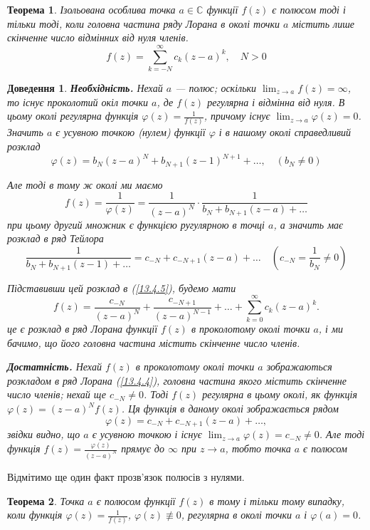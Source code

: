 \documentclass[fontsize=14pt]{scrartcl}
\theoremstyle{theorem}
\newtheorem{thm}{Теорема}[section]
\theoremstyle{proof}
\newtheorem*{dov}{Доведення}
\begin{document}
\begin{thm}\label{13.4.1}
Ізольована особлива точка $a\in\mathbb{C}$ функції $f(z)$ є полюсом тоді і тільки тоді, коли головна частина ряду Лорана в околі точки $a$ містить лише скінченне число відмінних від нуля членів.
\begin{equation}\label{13.4.4}
  f(z)=\sum_{k=-N}^{\infty}c_k(z-a)^k, \quad N>0
\end{equation}
\end{thm}
\begin{dov}
\textbf{Необхідність.} Нехай $a$ --- полюс; оскільки $\lim_{z \to a}f(z)=\infty$, то існує проколотий окіл точки $a$, де $f(z)$ регулярна і відмінна від нуля. В цьому околі регулярна функція $\varphi(z)=\frac{1}{f(z)}$, причому існує $\lim_{z \to a}\varphi(z)=0$. Значить $a$ є усувною точкою (нулем) функції $\varphi$ і в нашому околі справедливий розклад
$$\varphi(z)=b_N(z-a)^N+b_{N+1}(z-1)^{N+1}+\dots, \quad (b_N\neq 0) $$

Але тоді в тому ж околі ми маємо
\begin{equation}\label{13.4.5}
  f(z)=\frac{1}{\varphi (z)}=\frac{1}{(z-a)^N}\cdot\frac{1}{b_N+b_{N+1}(z-a)+\dots}
\end{equation}
при цьому другий множник є функцією ругулярною в точці $a$, а значить має розклад в ряд Тейлора
$$\frac{1}{b_N+b_{N+1}(z-1)+\dots}=c_{-N}+c_{-N+1}(z-a)+\dots \quad (c_{-N}=\frac{1}{b_N}\neq 0)$$

Підставивши цей розклад в (\ref{13.4.5}), будемо мати
$$f(z)=\frac{c_{-N}}{(z-a)^N}+\frac{c_{-N+1}}{(z-a)^{N-1}}+\dots +\sum_{k=0}^{\infty}c_k(z-a)^k.$$
це є розклад в ряд Лорана функції $f(z)$ в проколотому околі точки $a$, і ми бачимо, що його головна частина містить скінченне число членів.

\textbf{Достатність.} Нехай $f(z)$ в проколотому околі точки $a$ зображаються розкладом в ряд Лорана (\ref{13.4.4}), головна частина якого містить скінченне число членів; нехай ще $c_{-N}\neq 0$. Тоді $f(z)$ регулярна в цьому околі, як функція $\varphi(z)=(z-a)^Nf(z)$. Ця функція в даному околі зображається рядом
$$\varphi(z)=c_{-N}+c_{-N+1}(z-a)+\dots,$$
звідки видно, що $a$ є усувною точкою і існує $\lim_{z \to a}\varphi(z)=c_{-N}\neq 0$. Але тоді функція $f(z)=\frac{\varphi (z)}{(z-a)^N}$ прямує до $\infty$ при $z \to a$, тобто точка $a$ є полюсом
\end{dov}

Відмітимо ще один факт прозв'язок полюсів з нулями.

\begin{thm}\label{thm.13.4.1}
  Точка $a$ є полюсом функції $f(z)$ в тому і тільки тому випадку, коли функція $\varphi(z)=\frac{1}{f(z)}$, $\varphi(z) \not\equiv 0$, регулярна в околі точки $a$ і $\varphi(a)=0$.
\end{thm}
\end{document}
